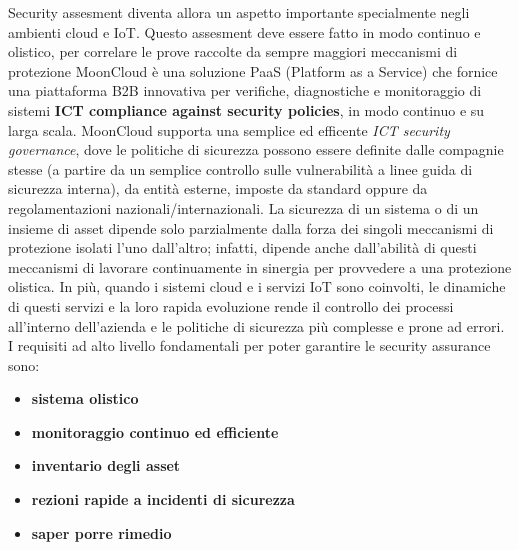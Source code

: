 Security assesment diventa allora un aspetto importante specialmente negli ambienti cloud e IoT. Questo 
assesment deve essere fatto in modo continuo e olistico, per correlare le prove raccolte da sempre maggiori 
meccanismi di protezione
\newline
MoonCloud è una soluzione PaaS (Platform as a Service) che fornice una piattaforma B2B innovativa per verifiche, 
diagnostiche e monitoraggio di sistemi \textbf{ICT compliance against security policies}, in modo continuo e su larga
scala.
MoonCloud supporta una semplice ed efficente \textit{ICT security governance}, dove le politiche di sicurezza possono
essere definite dalle compagnie stesse (a partire da un semplice controllo sulle vulnerabilità a linee guida di
sicurezza interna), da entità esterne, imposte da standard oppure da regolamentazioni nazionali/internazionali.
\newline
La sicurezza di un sistema o di un insieme di asset dipende solo parzialmente dalla forza dei
singoli meccanismi di protezione isolati l'uno dall'altro; infatti, dipende anche dall'abilità di questi meccanismi 
di lavorare continuamente in sinergia per provvedere a una protezione olistica.
In più, quando i sistemi cloud e i servizi IoT sono coinvolti, le dinamiche di questi servizi e la loro rapida 
evoluzione rende il controllo dei processi all'interno dell'azienda e le politiche di sicurezza 
più complesse e prone ad errori.
\newline
I requisiti ad alto livello fondamentali per poter garantire le security assurance sono:
\begin{itemize}
	\item \textbf{sistema olistico}
	\item \textbf{monitoraggio continuo ed efficiente}
	\item \textbf{inventario degli asset}
	\item \textbf{rezioni rapide a incidenti di sicurezza}
	\item \textbf{saper porre rimedio}
\end{itemize}